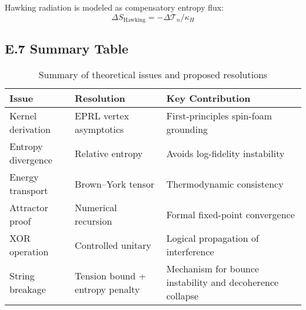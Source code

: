 Hawking radiation is modeled as compensatory entropy flux:
\[
\Delta S_{\text{Hawking}} = -\Delta \mathcal{T}_n / \kappa_H
\]

\subsection*{E.7 Summary Table}

\begin{table}[H]
\centering
\begin{tabular}{|l|l|l|}
\hline
\textbf{Issue} & \textbf{Resolution} & \textbf{Key Contribution} \\
\hline
Kernel derivation & EPRL vertex asymptotics & First-principles spin-foam grounding \\
Entropy divergence & Relative entropy & Avoids log-fidelity instability \\
Energy transport & Brown–York tensor & Thermodynamic consistency \\
Attractor proof & Numerical recursion & Formal fixed-point convergence \\
XOR operation & Controlled unitary & Logical propagation of interference \\
String breakage & Tension bound + entropy penalty & Mechanism for bounce instability and decoherence collapse \\
\hline
\end{tabular}
\caption{Summary of theoretical issues and proposed resolutions}
\end{table}
